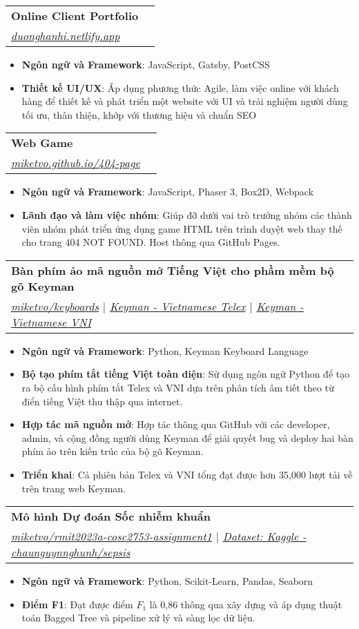 \documentclass[a4paper,11pt]{article}
\makeatletter
\newcommand{\resumeItem}[2]{
  \item\small{
    \textbf{#1}{: #2 \vspace{-2pt}}
  }
}
\newcommand{\resumeSubheading}[4]{
  \vspace{-2pt}\item
    \begin{tabular*}{0.97\textwidth}{l@{\extracolsep{\fill}}r}
      \textbf{#1} & #2 \\
      \textit{\small#3} & \textit{\small #4} \\
    \end{tabular*}\vspace{-6pt}
}
\newcommand{\resumeItemListStart}{\begin{itemize}}
\newcommand{\resumeItemListEnd}{\end{itemize}\vspace{-6pt}}
\makeatother
\begin{document}
    \resumeSubheading
      {Online Client Portfolio}{}
      {\href{https://duonghanhi.netlify.app/}{\faGlobe\space duonghanhi.netlify.app}}{}
      \resumeItemListStart
        \resumeItem{Ngôn ngữ và Framework}
          {JavaScript, Gatsby, PostCSS}
        \resumeItem{Thiết kế UI/UX}
          {Áp dụng phương thức Agile, làm việc online với khách hàng để thiết kế và phát triển một website với UI và trải nghiệm người dùng tối ưu, thân thiện, khớp với thương hiệu và chuẩn SEO}
    \resumeItemListEnd

    \resumeSubheading
      {Web Game}{}
      {\href{https://miketvo.github.io/404-page.html}{\faGlobe\space miketvo.github.io/404-page}}{}
      \resumeItemListStart
        \resumeItem{Ngôn ngữ và Framework}
          {JavaScript, Phaser 3, Box2D, Webpack}
        \resumeItem{Lãnh đạo và làm việc nhóm}
          {Giúp đỡ dưới vai trò trưởng nhóm các thành viên nhóm phát triển ứng dụng game HTML trên trình duyệt web thay thế cho trang 404 NOT FOUND. Host thông qua GitHub Pages.}
      \resumeItemListEnd

    \resumeSubheading
      {Bàn phím ảo mã nguồn mở Tiếng Việt cho phầm mềm bộ gõ Keyman}{}
      {\href{https://github.com/miketvo/keyboards}{\faGithub\space miketvo/keyboards} $|$ \href{https://keyman.com/keyboards/vietnamese_telex}{\faGlobe\space Keyman - Vietnamese Telex} $|$ \href{https://keyman.com/keyboards/vietnamese_vni}{\faGlobe\space Keyman - Vietnamese VNI}}{}
      \resumeItemListStart
        \resumeItem{Ngôn ngữ và Framework}
          {Python, Keyman Keyboard Language}
        \resumeItem{Bộ tạo phím tắt tiếng Việt toàn diện}
          {Sử dụng ngôn ngữ Python để tạo ra bộ cấu hình phím tắt Telex và VNI dựa trên phân tích âm tiết theo từ điển tiếng Việt thu thập qua internet.}
        \resumeItem{Hợp tác mã nguồn mở}
          {Hợp tác thông qua GitHub với các developer, admin, và cộng đồng người dùng Keyman để giải quyết bug và deploy hai bàn phím ảo trên kiến trúc của bộ gõ Keyman.}
        \resumeItem{Triển khai}
          {Cả phiên bản Telex và VNI tổng đạt được hơn 35,000 lượt tải về trên trang web Keyman.}
      \resumeItemListEnd

    \resumeSubheading
      {Mô hình Dự đoán Sốc nhiễm khuẩn}{}
      {\href{https://github.com/miketvo/rmit2023a-cosc2753-assignment1}{\faGithub\space miketvo/rmit2023a-cosc2753-assignment1} $|$ \href{https://www.kaggle.com/datasets/chaunguynnghunh/sepsis/}{\faDatabase\space Dataset: Kaggle - chaunguynnghunh/sepsis}}{}
      \resumeItemListStart
        \resumeItem{Ngôn ngữ và Framework}
          {Python, Scikit-Learn, Pandas, Seaborn}
        \resumeItem{Điểm F1}
          {Đạt được điểm $F_1$ là 0,86 thông qua xây dựng và áp dụng thuật toán Bagged Tree và pipeline xử lý và sàng lọc dữ liệu.}
      \resumeItemListEnd
\end{document}

